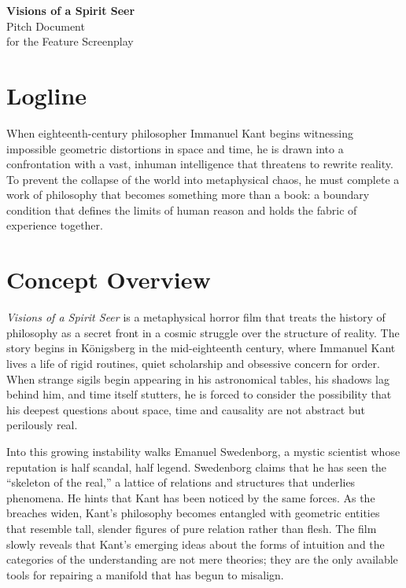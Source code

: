 \documentclass[12pt]{article}
\begin{document}
\begin{center}
{\Large\bfseries Visions of a Spirit Seer}\\[1.5em]
{\large Pitch Document}\\[0.5em]
{\large for the Feature Screenplay}\\[3em]
\end{center}

\section*{Logline}

When eighteenth-century philosopher Immanuel Kant begins witnessing impossible geometric distortions in space and time, he is drawn into a confrontation with a vast, inhuman intelligence that threatens to rewrite reality. To prevent the collapse of the world into metaphysical chaos, he must complete a work of philosophy that becomes something more than a book: a boundary condition that defines the limits of human reason and holds the fabric of experience together.

\section*{Concept Overview}

\emph{Visions of a Spirit Seer} is a metaphysical horror film that treats the history of philosophy as a secret front in a cosmic struggle over the structure of reality. The story begins in Königsberg in the mid-eighteenth century, where Immanuel Kant lives a life of rigid routines, quiet scholarship and obsessive concern for order. When strange sigils begin appearing in his astronomical tables, his shadows lag behind him, and time itself stutters, he is forced to consider the possibility that his deepest questions about space, time and causality are not abstract but perilously real.

Into this growing instability walks Emanuel Swedenborg, a mystic scientist whose reputation is half scandal, half legend. Swedenborg claims that he has seen the “skeleton of the real,” a lattice of relations and structures that underlies phenomena. He hints that Kant has been noticed by the same forces. As the breaches widen, Kant’s philosophy becomes entangled with geometric entities that resemble tall, slender figures of pure relation rather than flesh. The film slowly reveals that Kant’s emerging ideas about the forms of intuition and the categories of the understanding are not mere theories; they are the only available tools for repairing a manifold that has begun to misalign.
\end{document}
